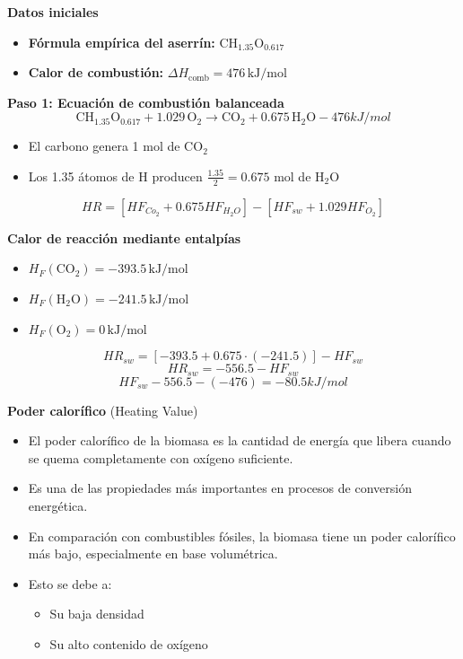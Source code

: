 \documentclass[../../main.tex]{subfiles}
\begin{document}
\begin{frame}{\textbf{Datos iniciales}}
\begin{itemize}
  \item \textbf{F\'ormula emp\'irica del aserr\'in:} \( \text{CH}_{1.35}\text{O}_{0.617} \)
  \item \textbf{Calor de combusti\'on:} \( \Delta H_{\text{comb}} = 476\, \text{kJ/mol} \)
\end{itemize}

{\textbf{Paso 1: Ecuaci\'on de combusti\'on balanceada}}
\[
\text{CH}_{1.35}\text{O}_{0.617} + 1.029\, \text{O}_2 \rightarrow \text{CO}_2 + 0.675\, \text{H}_2\text{O} -476 kJ/mol
\]


\begin{itemize}
  \item El carbono genera 1 mol de CO$_2$
  \item Los 1.35 \'atomos de H producen \( \frac{1.35}{2} = 0.675 \) mol de H$_2$O 
\end{itemize}


\[
HR =[HF_{Co_2}+0.675HF_{H_2O}]-[HF_{sw}+1.029HF_{O_2}]
\]
\end{frame}
\begin{frame}{\textbf{Calor de reacci\'on mediante entalp\'ias}}
\begin{itemize}
  \item \( H_F(\text{CO}_2) = -393.5\, \text{kJ/mol} \)
  \item \(  H_F(\text{H}_2\text{O}) = -241.5\, \text{kJ/mol} \)
  \item \( H_F(\text{O}_2) = 0\, \text{kJ/mol} \)
\end{itemize}

\[
HR_{sw} = \left[ -393.5 + 0.675 \cdot (-241.5) \right] - HF_{sw}
\]
\[
HR_{sw}=-556.5 - HF_{sw}
\]
\[
HF_{sw}-556.5-(-476)= -80.5 kJ/mol
\]


\end{frame}
\begin{frame}{\textbf{Poder calor\'ifico} (Heating Value) }
\begin{itemize}
  \item El poder calor\'ifico de la biomasa es la cantidad de energ\'ia que libera cuando se quema completamente con ox\'igeno suficiente.
  \item Es una de las propiedades m\'as importantes en procesos de conversi\'on energ\'etica.
  \item En comparaci\'on con combustibles f\'osiles, la biomasa tiene un poder calor\'ifico m\'as bajo, especialmente en base volum\'etrica.
  \item Esto se debe a:
  \begin{itemize}
    \item Su baja densidad
    \item Su alto contenido de ox\'igeno
  \end{itemize}
\end{itemize}
\end{frame}
\end{document}
